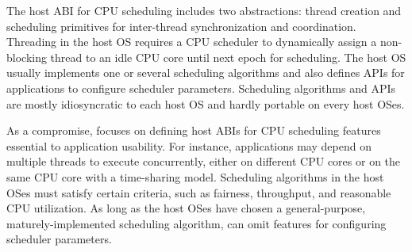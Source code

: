 \label{sec:abi:thread}

The host ABI for CPU scheduling includes two abstractions:
thread creation and scheduling primitives
for inter-thread synchronization and coordination.
Threading in the host OS requires a CPU scheduler
to dynamically assign a non-blocking thread to an idle CPU core until next epoch for scheduling.
The host OS usually implements one or several scheduling algorithms and also defines APIs for applications
to configure scheduler parameters.
Scheduling algorithms and
APIs are mostly idiosyncratic to each host OS and hardly portable on every host OSes.



As a compromise, \graphene{} focuses on defining host ABIs for CPU scheduling features
essential to application usability.
For instance, applications may depend on multiple threads to execute concurrently, either on different CPU cores or on the same CPU core with a time-sharing model.
Scheduling algorithms in the host OSes must satisfy certain criteria, such as fairness, throughput, and reasonable CPU utilization.
As long as the host OSes have chosen
a general-purpose, maturely-implemented scheduling algorithm,
\thehostabi{} can omit features
for configuring scheduler parameters. 











